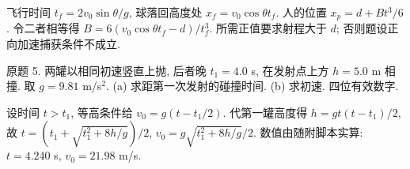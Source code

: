 \begin{solution}
飞行时间 $t_f=2v_0\sin\theta/g$, 球落回高度处 $x_f=v_0\cos\theta t_f$. 人的位置 $x_p=d+Bt^3/6$. 令二者相等得 $B=6(v_0\cos\theta t_f-d)/t_f^3$. 所需正值要求射程大于 $d$; 否则题设正向加速捕获条件不成立.
\end{solution}
\begin{exercise}
原题 5. 两罐以相同初速竖直上抛, 后者晚 $t_1=4.0$ s, 在发射点上方 $h=5.0$ m 相撞. 取 $g=9.81$ m/s$^2$. (a) 求距第一次发射的碰撞时间. (b) 求初速. 四位有效数字.
\end{exercise}
\begin{solution}
设时间 $t>t_1$, 等高条件给 $v_0=g(t-t_1/2)$. 代第一罐高度得 $h=g t(t-t_1)/2$, 故 $t=(t_1+\sqrt{t_1^2+8h/g})/2$, $v_0=g\sqrt{t_1^2+8h/g}/2$. 数值由随附脚本实算: $t=4.240$ s, $v_0=21.98$ m/s.
\end{solution}
